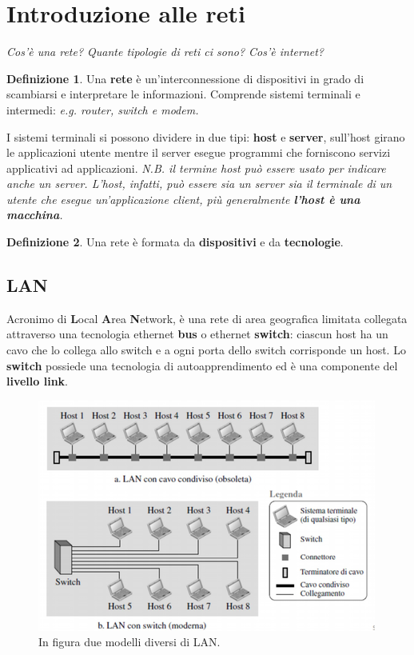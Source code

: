 \documentclass[11pt,a4paper,oneside]{book}
\theoremstyle{definition}
\newtheorem{definition}{Definizione}[section]
\begin{document}
\section{Introduzione alle reti}
\textit{Cos'è una rete? Quante tipologie di reti ci sono? Cos'è internet?}

\theoremstyle{definition}
\begin{definition}
	Una \textbf{rete} è un'interconnessione di dispositivi in grado di scambiarsi e interpretare le informazioni. Comprende sistemi terminali e intermedi: \textit{e.g. router, switch e modem.}
\end{definition}
I sistemi terminali si possono dividere in due tipi: \textbf{host} e \textbf{server}, sull'host girano le applicazioni utente mentre il server esegue programmi che forniscono servizi applicativi ad applicazioni. \newline \textit{N.B. il termine host può essere usato per indicare anche un server. \newline L'host, infatti, può essere sia un server sia il terminale di un utente che esegue un'applicazione client, più generalmente \textbf{l'host è una macchina}.}

\theoremstyle{definition}
\begin{definition}
	Una rete è formata da \textbf{dispositivi} e da \textbf{tecnologie}.
\end{definition}

\subsection{LAN}
Acronimo di \textbf{L}ocal \textbf{A}rea \textbf{N}etwork, è
una rete di area geografica limitata collegata attraverso una tecnologia ethernet \textbf{bus} o ethernet \textbf{switch}: ciascun host ha un cavo che lo collega allo switch e a ogni porta dello switch corrisponde un host. Lo \textbf{switch} possiede una tecnologia di autoapprendimento ed è una componente del \textbf{livello link}.
\begin{figure}[!h]
	\includegraphics[scale=0.62]{Immagini/LAN.png}
	\centering
	\caption{In figura due modelli diversi di LAN.}
\end{figure}
\end{document}
